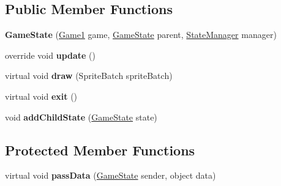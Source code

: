 \subsection*{Public Member Functions}
\begin{DoxyCompactItemize}
\item 
\hypertarget{class_simple_r_p_g_1_1_states_1_1_game_state_a0739c91318628b0180c6039558fdaf59}{{\bfseries Game\+State} (\hyperlink{class_simple_r_p_g_1_1_game1}{Game1} game, \hyperlink{class_simple_r_p_g_1_1_states_1_1_game_state}{Game\+State} parent, \hyperlink{class_simple_r_p_g_1_1_states_1_1_state_manager}{State\+Manager} manager)}\label{class_simple_r_p_g_1_1_states_1_1_game_state_a0739c91318628b0180c6039558fdaf59}

\item 
\hypertarget{class_simple_r_p_g_1_1_states_1_1_game_state_ac89d802264bde3ba8d889375f413e4ea}{override void {\bfseries update} ()}\label{class_simple_r_p_g_1_1_states_1_1_game_state_ac89d802264bde3ba8d889375f413e4ea}

\item 
\hypertarget{class_simple_r_p_g_1_1_states_1_1_game_state_a0c2042a1d0c61f53d630c4befbb130b9}{virtual void {\bfseries draw} (Sprite\+Batch sprite\+Batch)}\label{class_simple_r_p_g_1_1_states_1_1_game_state_a0c2042a1d0c61f53d630c4befbb130b9}

\item 
\hypertarget{class_simple_r_p_g_1_1_states_1_1_game_state_a52586b02847099e993bb3acd30f996a5}{virtual void {\bfseries exit} ()}\label{class_simple_r_p_g_1_1_states_1_1_game_state_a52586b02847099e993bb3acd30f996a5}

\item 
\hypertarget{class_simple_r_p_g_1_1_states_1_1_game_state_a2a3a4da7363acb938403f669517b9de0}{void {\bfseries add\+Child\+State} (\hyperlink{class_simple_r_p_g_1_1_states_1_1_game_state}{Game\+State} state)}\label{class_simple_r_p_g_1_1_states_1_1_game_state_a2a3a4da7363acb938403f669517b9de0}

\end{DoxyCompactItemize}
\subsection*{Protected Member Functions}
\begin{DoxyCompactItemize}
\item 
\hypertarget{class_simple_r_p_g_1_1_states_1_1_game_state_aec6e20917880e857868ac584906515c6}{virtual void {\bfseries pass\+Data} (\hyperlink{class_simple_r_p_g_1_1_states_1_1_game_state}{Game\+State} sender, object data)}\label{class_simple_r_p_g_1_1_states_1_1_game_state_aec6e20917880e857868ac584906515c6}

\end{DoxyCompactItemize}

